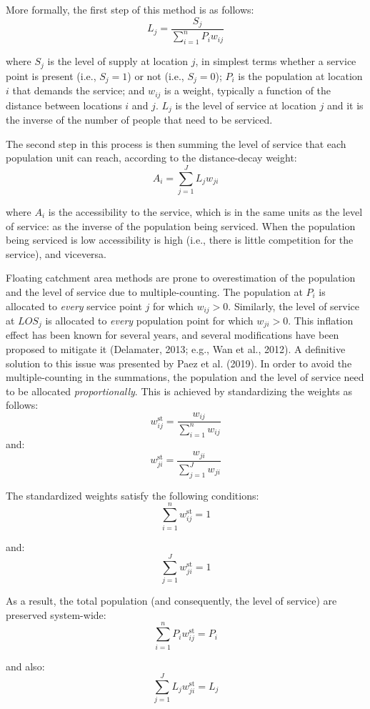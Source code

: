 \documentclass[]{elsarticle} %
\begin{document}
More formally, the first step of this method is as follows: \[
L_j = \frac{S_j}{\sum_{i=1}^nP_iw_{ij}}
\]

\noindent where \(S_j\) is the level of supply at location \(j\), in
simplest terms whether a service point is present (i.e., \(S_j=1\)) or
not (i.e., \(S_j=0\)); \(P_i\) is the population at location \(i\) that
demands the service; and \(w_{ij}\) is a weight, typically a function of
the distance between locations \(i\) and \(j\). \(L_j\) is the level of
service at location \(j\) and it is the inverse of the number of people
that need to be serviced.

The second step in this process is then summing the level of service
that each population unit can reach, according to the distance-decay
weight: \[
A_i = \sum_{j=1}^JL_jw_{ji}
\]

\noindent where \(A_i\) is the accessibility to the service, which is in
the same units as the level of service: as the inverse of the population
being serviced. When the population being serviced is low accessibility
is high (i.e., there is little competition for the service), and
viceversa.

Floating catchment area methods are prone to overestimation of the
population and the level of service due to multiple-counting. The
population at \(P_i\) is allocated to \emph{every} service point \(j\)
for which \(w_{ij}>0\). Similarly, the level of service at \(LOS_j\) is
allocated to \emph{every} population point for which \(w_{ji}>0\). This
inflation effect has been known for several years, and several
modifications have been proposed to mitigate it (Delamater, 2013; e.g.,
Wan et al., 2012). A definitive solution to this issue was presented by
Paez et al. (2019). In order to avoid the multiple-counting in the
summations, the population and the level of service need to be allocated
\emph{proportionally}. This is achieved by standardizing the weights as
follows: \[
w_{ij}^\text{st} = \frac{w_{ij}}{\sum_{i=1}^nw_{ij}}
\] \noindent and: \[
w_{ji}^\text{st} = \frac{w_{ji}}{\sum_{j=1}^Jw_{ji}}
\]

The standardized weights satisfy the following conditions: \[
\sum_{i=1}^nw_{ij}^\text{st}=1
\]

\noindent and: \[
\sum_{j=1}^Jw_{ji}^\text{st}=1
\]

As a result, the total population (and consequently, the level of
service) are preserved system-wide: \[
\sum_{i=1}^nP_iw_{ij}^\text{st}=P_i
\]

\noindent and also: \[
\sum_{j=1}^JL_jw_{ji}^\text{st}=L_j
\]
\end{document}
